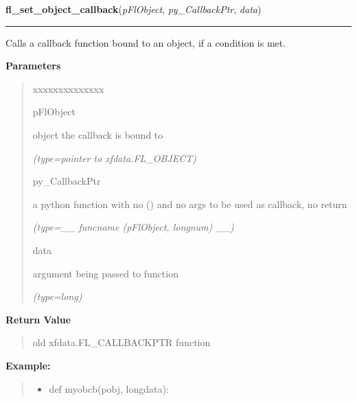 \hspace{.8\funcindent}\begin{boxedminipage}{\funcwidth}

    \raggedright \textbf{fl\_set\_object\_callback}(\textit{pFlObject}, \textit{py\_CallbackPtr}, \textit{data})

    \vspace{-1.5ex}

    \rule{\textwidth}{0.5\fboxrule}
\setlength{\parskip}{2ex}
    Calls a callback function bound to an object, if a condition is met.

\setlength{\parskip}{1ex}
      \textbf{Parameters}
      \vspace{-1ex}

      \begin{quote}
        \begin{Ventry}{xxxxxxxxxxxxxx}

          \item[pFlObject]

          object the callback is bound to

            {\it (type=pointer to xfdata.FL\_OBJECT)}

          \item[py\_CallbackPtr]

          a python function with no () and no args to be used as callback, 
          no return

            {\it (type=\_\_ funcname (pFlObject, longnum) \_\_)}

          \item[data]

          argument being passed to function

            {\it (type=long)}

        \end{Ventry}

      \end{quote}

      \textbf{Return Value}
    \vspace{-1ex}

      \begin{quote}
      old xfdata.FL\_CALLBACKPTR function

      \end{quote}

\textbf{Example:}
\begin{quote}
  \begin{itemize}

  \item
    \setlength{\parskip}{0.6ex}
def myobcb(pobj, longdata):




\end{itemize}
\end{quote}
\end{boxedminipage}

